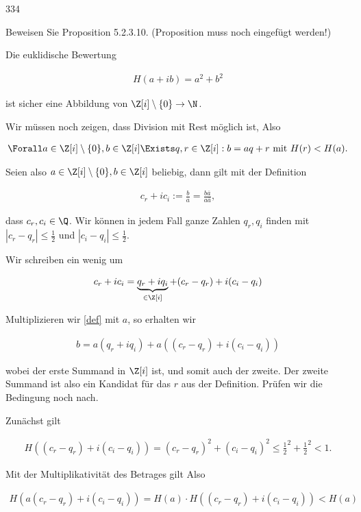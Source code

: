 \begin{algebraUE}{334}

Beweisen Sie Proposition 5.2.3.10. (Proposition muss noch eingefügt werden!)

\end{algebraUE}

\begin{solution}

Die euklidische Bewertung

\begin{align*}
  H(a+ib) = a^2 + b^2
\end{align*}

ist sicher eine Abbildung von $\Z [i] \setminus \{0\} \to \N$.

Wir müssen noch zeigen, dass Division mit Rest möglich ist, Also

\begin{align*}
  \Forall a \in \Z [i] \setminus \{0\}, b \in \Z [i] \Exists q,r \in \Z [i]: b = aq + r \text{~mit~} H(r) < H(a).
\end{align*}

Seien also $a \in \Z [i] \setminus \{0\}, b \in \Z [i]$ beliebig, dann gilt mit der Definition

\begin{align}\label{def}
  c_r + i c_i := \frac{b}{a} = \frac{b\overline{a}}{a\overline{a}},
\end{align}

dass $c_r, c_i \in \Q$. Wir können in jedem Fall ganze Zahlen $q_r, q_i$ finden mit $|c_r-q_r| \leq \frac{1}{2}$ und $|c_i-q_i| \leq \frac{1}{2}$.

Wir schreiben ein wenig um

\begin{align*}
  c_r + i c_i = \underbrace{q_r + i q_i}_{\in \Z [i]} + (c_r- q_r) + i (c_i - q_i)
\end{align*}

Multiplizieren wir \eqref{def} mit $a$, so erhalten wir

\begin{align*}
  b = a(q_r + i q_i) + a((c_r- q_r) + i (c_i - q_i))
\end{align*}

wobei der erste Summand in $\Z [i]$ ist, und somit auch der zweite. Der zweite Summand ist also ein Kandidat für das $r$ aus der Definition. Prüfen wir die Bedingung noch nach.

Zunächst gilt

\begin{align*}
  H((c_r- q_r) + i (c_i - q_i)) = (c_r- q_r)^2 + (c_i - q_i)^2 \leq \frac{1}{2}^2 + \frac{1}{2}^2 < 1.
\end{align*}

Mit der Multiplikativität des Betrages gilt Also

\begin{align*}
  H(a(c_r- q_r) + i (c_i - q_i)) = H(a) \cdot H((c_r- q_r) + i (c_i - q_i)) < H(a)
\end{align*}


\end{solution}
